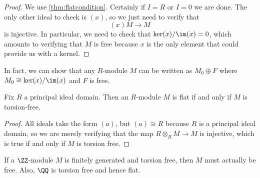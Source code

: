\begin{proof}
	We use \autoref{thm:flatcondition}. Certainly if $I=R$ or $I=0$ we are done. The only other ideal to check is $(x)$, so we just need to verify that
	\[(x)M\to M\]
	is injective. In particular, we need to check that $\ker(x)/\im(x)=0$, which amounts to verifying that $M$ is free because $x$ is the only element that could provide us with a kernel.
\end{proof}
\begin{remark}[Serganova]
	In fact, we can show that any $R$-module $M$ can be written as $M_0\oplus F$ where $M_0\cong\ker(x)/\im(x)$ and $F$ is free.
\end{remark}
\begin{exe}
	Fix $R$ a principal ideal domain. Then an $R$-module $M$ is flat if and only if $M$ is torsion-free.
\end{exe}
\begin{proof}
	All ideals take the form $(a)$, but $(a)\cong R$ because $R$ is a principal ideal domain, so we are merely verifying that the map $R\otimes_RM\to M$ is injective, which is true if and only if $M$ is torsion free.
\end{proof}
\begin{example}
	If a $\ZZ$-module $M$ is finitely generated and torsion free, then $M$ must actually be free. Also, $\QQ$ is torsion free and hence flat.
\end{example}

